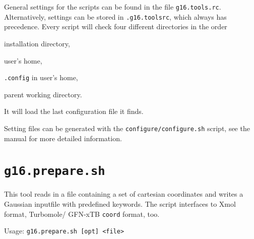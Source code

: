 \documentclass[   %
  final,          %
  a4paper,        %
  rscols=3,       %
  margin=1.0cm,   %
]{refsheet}
\begin{document}
General settings for the scripts can be found in the file \texttt{g16.tools.rc}.
Alternatively, settings can be stored in \texttt{.g16.toolsrc}, 
which always has precedence.
Every script will check four different directories in the order
\begin{enumerate*}
\item installation directory,
\item user's home,
\item \texttt{.config} in user's home,
\item parent working directory.
\end{enumerate*}
It will load the last configuration file it finds.

Setting files can be generated with the \texttt{configure/configure.sh} script,
see the manual for more detailed information.

\section{\texttt{g16.prepare.sh}}

This tool reads in a file containing a set of cartesian coordinates and
writes a Gaussian inputfile with predefined keywords. 
The script interfaces to Xmol format, 
Turbomole/ GFN-xTB \texttt{coord} format, too.

Usage: \texttt{g16.prepare.sh [opt] <file>}
\end{document}
